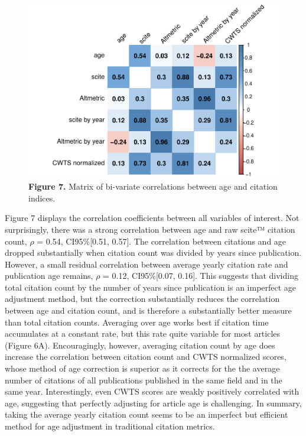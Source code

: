 \documentclass[
  man,floatsintext]{apa6}
\begin{document}
\begin{figure}
\centering
\includegraphics{RVcn_feasibility_in_social_neuroscience_cortex_files/figure-latex/fig7-1.pdf}
\caption{\label{fig:fig7}\textbf{Figure 7.} Matrix of bi-variate correlations between age and citation indices.}
\end{figure}

Figure 7 displays the correlation coefficients between all variables of interest. Not surprisingly, there was a strong correlation between age and raw scite™ citation count, \(\rho\) = 0.54, CI95\%{[}0.51, 0.57{]}. The correlation between citations and age dropped substantially when citation count was divided by years since publication. However, a small residual correlation between average yearly citation rate and publication age remains, \(\rho\) = 0.12, CI95\%{[}0.07, 0.16{]}. This suggests that dividing total citation count by the number of years since publication is an imperfect age adjustment method, but the correction substantially reduces the correlation between age and citation count, and is therefore a substantially better measure than total citation counts. Averaging over age works best if citation time accumulates at a constant rate, but this rate quite variable for most articles (Figure 6A). Encouragingly, however, averaging citation count by age does increase the correlation between citation count and CWTS normalized scores, whose method of age correction is superior as it corrects for the the average number of citations of all publications published in the same field and in the same year. Interestingly, even CWTS scores are weakly positively correlated with age, suggesting that perfectly adjusting for article age is challenging. In summary, taking the average yearly citation count seems to be an imperfect but efficient method for age adjustment in traditional citation metrics.
\end{document}
